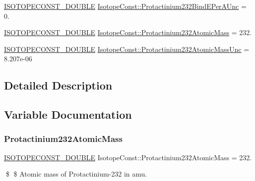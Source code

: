 \begin{DoxyCompactItemize}
\item 
\mbox{\hyperlink{group___isotope_const-_macros_ga8f45a7272ce02c0b4c65c44636ed719a}{I\+S\+O\+T\+O\+P\+E\+C\+O\+N\+S\+T\+\_\+\+D\+O\+U\+B\+LE}} \mbox{\hyperlink{group___isotope_const-_protactinium-_pa232_ga79f6dc62093001c5e06190e26eb695ae}{Isotope\+Const\+::\+Protactinium232\+Bind\+E\+Per\+A\+Unc}} = 0.
\item 
\mbox{\hyperlink{group___isotope_const-_macros_ga8f45a7272ce02c0b4c65c44636ed719a}{I\+S\+O\+T\+O\+P\+E\+C\+O\+N\+S\+T\+\_\+\+D\+O\+U\+B\+LE}} \mbox{\hyperlink{group___isotope_const-_protactinium-_pa232_gad2650de327f204db004747d7568d44cd}{Isotope\+Const\+::\+Protactinium232\+Atomic\+Mass}} = 232.
\item 
\mbox{\hyperlink{group___isotope_const-_macros_ga8f45a7272ce02c0b4c65c44636ed719a}{I\+S\+O\+T\+O\+P\+E\+C\+O\+N\+S\+T\+\_\+\+D\+O\+U\+B\+LE}} \mbox{\hyperlink{group___isotope_const-_protactinium-_pa232_ga7382509a30bd75ef0c39fb819d28dbd2}{Isotope\+Const\+::\+Protactinium232\+Atomic\+Mass\+Unc}} = 8.\+207e-\/06
\end{DoxyCompactItemize}


\subsection{Detailed Description}


\subsection{Variable Documentation}
\mbox{\label{group___isotope_const-_protactinium-_pa232_gad2650de327f204db004747d7568d44cd}} 
\subsubsection{\texorpdfstring{Protactinium232\+Atomic\+Mass}{Protactinium232AtomicMass}}
{\footnotesize\ttfamily \mbox{\hyperlink{group___isotope_const-_macros_ga8f45a7272ce02c0b4c65c44636ed719a}{I\+S\+O\+T\+O\+P\+E\+C\+O\+N\+S\+T\+\_\+\+D\+O\+U\+B\+LE}} Isotope\+Const\+::\+Protactinium232\+Atomic\+Mass = 232.}

\$ \$ Atomic mass of Protactinium-\/232 in amu. \mbox{\label{group___isotope_const-_protactinium-_pa232_ga7382509a30bd75ef0c39fb819d28dbd2}} 
